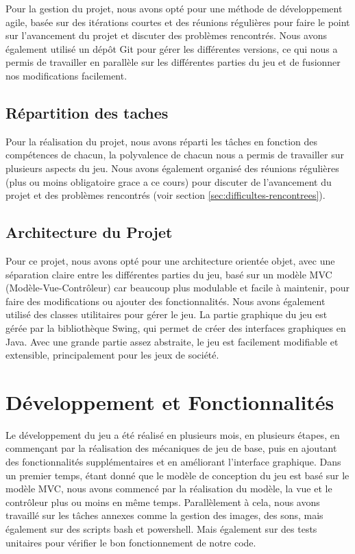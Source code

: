 \documentclass{article}
\begin{document}
    Pour la gestion du projet, nous avons opté pour une méthode de développement agile, basée sur des itérations courtes et des réunions régulières pour faire le point sur l'avancement du projet et discuter des problèmes rencontrés.
    Nous avons également utilisé un dépôt Git pour gérer les différentes versions, ce qui nous a permis de travailler en parallèle sur les différentes parties du jeu et de fusionner nos modifications facilement.


    \subsection{Répartition des taches}\label{subsec:repartition-des-taches}
    Pour la réalisation du projet, nous avons réparti les tâches en fonction des compétences de chacun, la polyvalence de chacun nous a permis de travailler sur plusieurs aspects du jeu.
    Nous avons également organisé des réunions régulières (plus ou moins obligatoire grace a ce cours) pour discuter de l'avancement du projet et des problèmes rencontrés (voir section \ref{sec:difficultes-rencontrees}).


    \subsection{Architecture du Projet}\label{subsec:architecture-du-projet}
    Pour ce projet, nous avons opté pour une architecture orientée objet, avec une séparation claire entre les différentes parties du jeu, basé sur un modèle MVC (Modèle-Vue-Contrôleur) car beaucoup plus modulable et facile à maintenir, pour faire des modifications ou ajouter des fonctionnalités.
    Nous avons également utilisé des classes utilitaires pour gérer le jeu.
    La partie graphique du jeu est gérée par la bibliothèque Swing, qui permet de créer des interfaces graphiques en Java.
    Avec une grande partie assez abstraite, le jeu est facilement modifiable et extensible, principalement pour les jeux de société.



    \section{Développement et Fonctionnalités}\label{sec:developpement-et-fonctionnalites}

    Le développement du jeu a été réalisé en plusieurs mois, en plusieurs étapes, en commençant par la réalisation des mécaniques de jeu de base, puis en ajoutant des fonctionnalités supplémentaires et en améliorant l'interface graphique.
    Dans un premier temps, étant donné que le modèle de conception du jeu est basé sur le modèle MVC, nous avons commencé par la réalisation du modèle, la vue et le contrôleur plus ou moins en même temps.
    Parallèlement à cela, nous avons travaillé sur les tâches annexes comme la gestion des images, des sons, mais également sur des scripts bash et powershell.
    Mais également sur des tests unitaires pour vérifier le bon fonctionnement de notre code.
\end{document}
